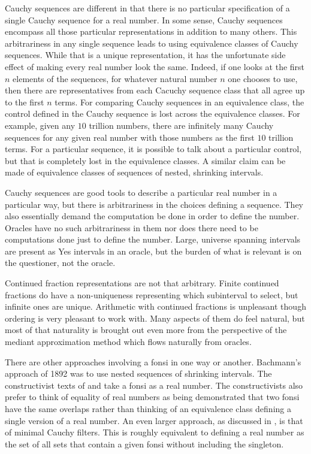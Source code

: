 \documentclass[12pt]{article}
\theoremstyle{remark}
\begin{document}
Cauchy sequences are different in that there is no particular specification of a single Cauchy sequence for a real number. In some sense, Cauchy sequences encompass all those particular representations in addition to many others. This arbitrariness in any single sequence leads to using equivalence classes of Cauchy sequences. While that is a unique representation, it has the unfortunate side effect of making every real number look the same. Indeed, if one looks at the first $n$ elements of the sequences, for whatever natural number $n$ one chooses to use, then there are representatives from each Cacuchy sequence class that all agree up to the first $n$ terms. For comparing Cauchy sequences in an equivalence class, the control defined in the Cauchy sequence is lost across the equivalence classes. For example, given any $10$ trillion numbers, there are infinitely many Cauchy sequences for any given real number with those numbers as the first $10$ trillion terms. For a particular sequence, it is possible to talk about a particular control, but that is completely lost in the equivalence classes. A similar claim can be made of equivalence classes of sequences of nested, shrinking intervals. 

Cauchy sequences are good tools to describe a particular real number in a particular way, but there is arbitrariness in the choices defining a sequence. They also essentially demand the computation be done in order to define the number. Oracles have no such arbitrariness in them nor does there need to be computations done just to define the number. Large, universe spanning intervals are present as Yes intervals in an oracle, but the burden of what is relevant is on the questioner, not the oracle. 

Continued fraction representations are not that arbitrary. Finite continued fractions do have a non-uniqueness representing which subinterval to select, but infinite ones are unique. Arithmetic with continued fractions is unpleasant though ordering is very pleasant to work with. Many aspects of them do feel natural, but most of that naturality is brought out even more from the perspective of the mediant approximation method which flows naturally from oracles. 

There are other approaches involving a fonsi in one way or another. Bachmann's approach of 1892 was to use nested sequences of shrinking intervals. The constructivist texts of \cite{bridger} and \cite{bridges} take a fonsi as a real number. The constructivists also prefer to think of equality of real numbers as being demonstrated that two fonsi have the same overlaps rather than thinking of an equivalence class defining a single version of a real number. An even larger approach, as discussed in \cite{ittay-2015}, is that of minimal Cauchy filters. This is roughly equivalent to defining a real number as the set of all sets that contain a given fonsi without including the singleton. 
\end{document}
